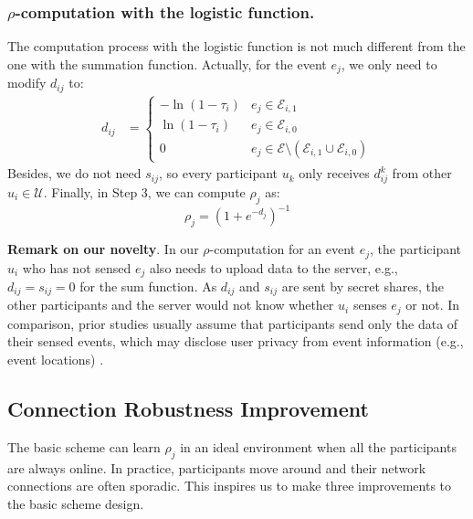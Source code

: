 \subsubsection{$\rho$-computation with the logistic function.} The computation process with the logistic function is not much different from the one with the summation function. Actually, for the event $e_j$, we only need to modify $d_{ij}$ to:
 \begin{align}
 	d_{ij} & =
 	\begin{cases}
 		-\ln(1-\tau_i) & e_j \in \mathcal E_{i,1} \\
 	    \ln (1-\tau_i) & e_j \in \mathcal E_{i,0}\\
 		0 & e_j \in \mathcal E\setminus(\mathcal E_{i,1}\cup \mathcal E_{i,0})
 	\end{cases}
 \end{align}
Besides, we do not need $s_{ij}$, so every participant $u_k$ only receives $d_{ij}^k$ from other $u_i \in \mathcal U$. Finally, in Step 3, we can compute $\rho_j$ as:
\begin{equation}
	\rho_j = (1+e^{-d_j})^{-1}
\end{equation}

\textbf{Remark on our novelty}. In our $\rho$-computation for an event $e_j$, the participant $u_i$ who has not sensed $e_j$ also needs to upload data to the server, e.g., $d_{ij}=s_{ij}=0$ for the sum function. As $d_{ij}$ and $s_{ij}$ are sent by secret shares, the other participants and the server would not know whether $u_i$ senses $e_j$ or not. In comparison, prior studies usually assume that participants send only the data of their sensed events, which may disclose user privacy from event information (e.g., event locations) \citep{Miao2015CloudEnabledPT,Miao2017ALP,Miao2019PrivacyPreservingTD,Zheng2018LearningTT,Zheng2020PrivacyAwareAE,Zhang2021ReliableAP}.

\subsection{Connection Robustness Improvement}

The basic scheme can learn $\rho_j$ in an ideal environment when all the participants are always online. In practice, participants move around and their network connections are often sporadic. This inspires us to make three improvements to the basic scheme design.

